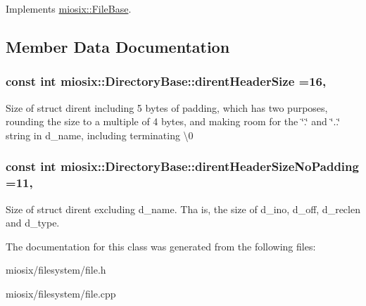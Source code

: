 Implements \hyperlink{classmiosix_1_1_file_base_a81ce4c4c059767a23625acdc3223a27d}{miosix\-::\-File\-Base}.



\subsection{Member Data Documentation}
\hypertarget{classmiosix_1_1_directory_base_ad907c19d39fed139feee02f57189783c}{
\subsubsection[{dirent\-Header\-Size}]{\setlength{\rightskip}{0pt plus 5cm}const int miosix\-::\-Directory\-Base\-::dirent\-Header\-Size =16\hspace{0.3cm}{\ttfamily [static]}, {\ttfamily [protected]}}}\label{classmiosix_1_1_directory_base_ad907c19d39fed139feee02f57189783c}
Size of struct dirent including 5 bytes of padding, which has two purposes, rounding the size to a multiple of 4 bytes, and making room for the \char`\"{}.\char`\"{} and \char`\"{}..\char`\"{} string in d\-\_\-name, including terminating \textbackslash{}0 \hypertarget{classmiosix_1_1_directory_base_af9d3fa9038ca46e67fa1de0d8439d8ac}{
\subsubsection[{dirent\-Header\-Size\-No\-Padding}]{\setlength{\rightskip}{0pt plus 5cm}const int miosix\-::\-Directory\-Base\-::dirent\-Header\-Size\-No\-Padding =11\hspace{0.3cm}{\ttfamily [static]}, {\ttfamily [protected]}}}\label{classmiosix_1_1_directory_base_af9d3fa9038ca46e67fa1de0d8439d8ac}
Size of struct dirent excluding d\-\_\-name. Tha is, the size of d\-\_\-ino, d\-\_\-off, d\-\_\-reclen and d\-\_\-type. 

The documentation for this class was generated from the following files\-:\begin{DoxyCompactItemize}
\item 
miosix/filesystem/file.\-h\item 
miosix/filesystem/file.\-cpp\end{DoxyCompactItemize}
